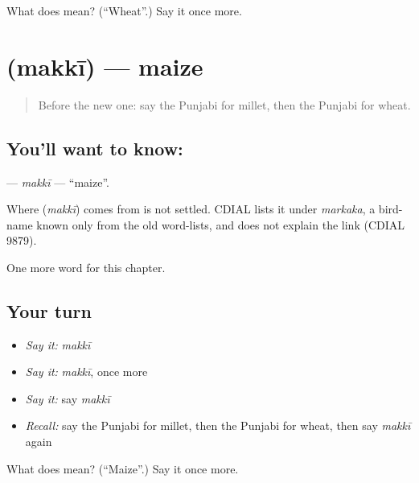 \begin{tcolorbox}[breakable,colback=teal!4,colframe=teal!35!black,title={Before you move on}]
What does  mean? (\textquotedblleft{}Wheat\textquotedblright{}.) Say it once more.
\end{tcolorbox}
\section[\texorpdfstring{\pa{ਮੱਕੀ} (makkī)}{ਮੱਕੀ (makkī)}]{ (makkī) — maize}

\label{lesson:PA-C122-makki}



\begin{quote}
Before the new one: say the Punjabi for millet, then the Punjabi for wheat.
\end{quote}

\subsection*{You'll want to know: }
\textbf{} — \emph{makkī} — \textquotedblleft{}maize\textquotedblright{}.

\begin{cousinweb}
Where \textbf{} (\emph{makkī}) comes from is not settled. CDIAL lists it under \emph{markaka}, a bird-name known only from the old word-lists, and does not explain the link (CDIAL 9879).
\end{cousinweb}

\begin{grammarlens}[title={What you've built}]
One more word for this chapter.
\end{grammarlens}

\subsection*{Your turn}
\begin{itemize}
\raggedright
  \item \emph{Say it:} \emph{makkī}
  \item \emph{Say it:} \emph{makkī}, once more
  \item \emph{Say it:} say \emph{makkī}
  \item \emph{Recall:} say the Punjabi for millet, then the Punjabi for wheat, then say \emph{makkī} again
\end{itemize}

\begin{tcolorbox}[breakable,colback=teal!4,colframe=teal!35!black,title={Before you move on}]
What does  mean? (\textquotedblleft{}Maize\textquotedblright{}.) Say it once more.
\end{tcolorbox}
